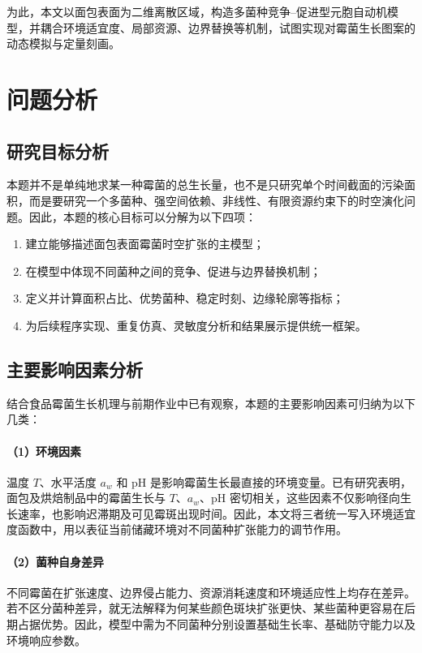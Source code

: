 \documentclass[12pt,a4paper]{ctexart}
\begin{document}
为此，本文以面包表面为二维离散区域，构造多菌种竞争--促进型元胞自动机模型，并耦合环境适宜度、局部资源、边界替换等机制，试图实现对霉菌生长图案的动态模拟与定量刻画。

\section{问题分析}

\subsection{研究目标分析}

本题并不是单纯地求某一种霉菌的总生长量，也不是只研究单个时间截面的污染面积，而是要研究一个多菌种、强空间依赖、非线性、有限资源约束下的时空演化问题。因此，本题的核心目标可以分解为以下四项：
\begin{enumerate}
    \item 建立能够描述面包表面霉菌时空扩张的主模型；
    \item 在模型中体现不同菌种之间的竞争、促进与边界替换机制；
    \item 定义并计算面积占比、优势菌种、稳定时刻、边缘轮廓等指标；
    \item 为后续程序实现、重复仿真、灵敏度分析和结果展示提供统一框架。
\end{enumerate}

\subsection{主要影响因素分析}

结合食品霉菌生长机理与前期作业中已有观察，本题的主要影响因素可归纳为以下几类：

\paragraph{（1）环境因素}
温度 \(T\)、水平活度 \(a_w\) 和 pH 是影响霉菌生长最直接的环境变量。已有研究表明，面包及烘焙制品中的霉菌生长与 \(T\)、\(a_w\)、pH 密切相关，这些因素不仅影响径向生长速率，也影响迟滞期及可见霉斑出现时间。因此，本文将三者统一写入环境适宜度函数中，用以表征当前储藏环境对不同菌种扩张能力的调节作用。

\paragraph{（2）菌种自身差异}
不同霉菌在扩张速度、边界侵占能力、资源消耗速度和环境适应性上均存在差异。若不区分菌种差异，就无法解释为何某些颜色斑块扩张更快、某些菌种更容易在后期占据优势。因此，模型中需为不同菌种分别设置基础生长率、基础防守能力以及环境响应参数。
\end{document}
